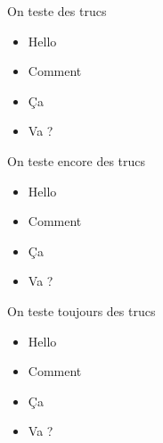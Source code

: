 \label{mecanique}

\begin{frame}{On teste des trucs}
  \begin{itemize}
    \item<1->Hello
    \item<2->Comment
    \item<3->Ça
    \item<4->Va ?
  \end{itemize}
\end{frame}

\begin{frame}{On teste encore des trucs}
  \begin{itemize}
    \item<1->Hello
    \item<2->Comment
    \item<3->Ça
    \item<4->Va ?
  \end{itemize}
\end{frame}

\begin{frame}{On teste toujours des trucs}
  \begin{itemize}
    \item<1->Hello
    \item<2->Comment
    \item<3->Ça
    \item<4->Va ?
  \end{itemize}
\end{frame}
